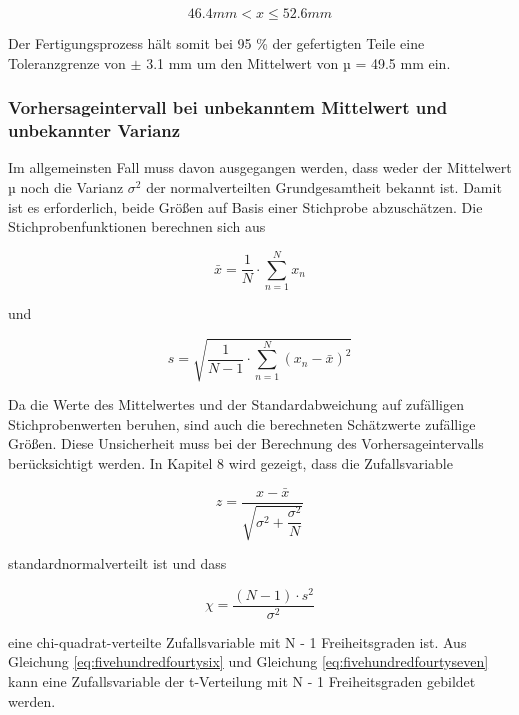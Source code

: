 \begin{equation}\label{eq:fivehundredfourtythree}
46.4 mm<x\le 52.6 mm
\end{equation}

\noindent Der Fertigungsprozess h\"{a}lt somit bei 95 \% der gefertigten Teile eine Toleranzgrenze von $\mathrm{\pm}$ 3.1 mm um den Mittelwert von µ = 49.5 mm ein.

\subsubsection{Vorhersageintervall bei unbekanntem Mittelwert und unbekannter Varianz}

\noindent Im allgemeinsten Fall muss davon ausgegangen werden, dass weder der Mittelwert µ noch die Varianz $\sigma^{2}$ der normalverteilten Grundgesamtheit bekannt ist. Damit ist es erforderlich, beide Gr\"{o}{\ss}en auf Basis einer Stichprobe abzusch\"{a}tzen. Die Stichprobenfunktionen berechnen sich aus

\begin{equation}\label{eq:fivehundredfourtyfour}
\bar{x}=\dfrac{1}{N} \cdot \sum _{n=1}^{N}x_{n} 
\end{equation}

\noindent und

\begin{equation}\label{eq:fivehundredfourtyfive}
s=\sqrt{\dfrac{1}{N-1} \cdot \sum _{n=1}^{N}\left(x_{n} -\bar{x}\right)^{2}}
\end{equation}

\noindent Da die Werte des Mittelwertes und der Standardabweichung auf zuf\"{a}lligen Stichprobenwerten beruhen, sind auch die berechneten Sch\"{a}tzwerte zuf\"{a}llige Gr\"{o}{\ss}en. Diese Unsicherheit muss bei der Berechnung des Vorhersageintervalls ber\"{u}cksichtigt werden. In Kapitel 8 wird gezeigt, dass die Zufallsvariable

\begin{equation}\label{eq:fivehundredfourtysix}
z=\dfrac{x-\bar{x}}{\sqrt{\sigma ^{2} +\dfrac{\sigma ^{2} }{N}}}
\end{equation}

\noindent standardnormalverteilt ist und dass

\begin{equation}\label{eq:fivehundredfourtyseven}
\chi =\dfrac{(N-1)\cdot s^{2} }{\sigma ^{2}}
\end{equation}

\noindent eine chi-quadrat-verteilte Zufallsvariable mit N - 1 Freiheitsgraden ist. Aus Gleichung \eqref{eq:fivehundredfourtysix} und Gleichung \eqref{eq:fivehundredfourtyseven} kann eine Zufallsvariable der t-Verteilung mit N - 1 Freiheitsgraden gebildet werden.

